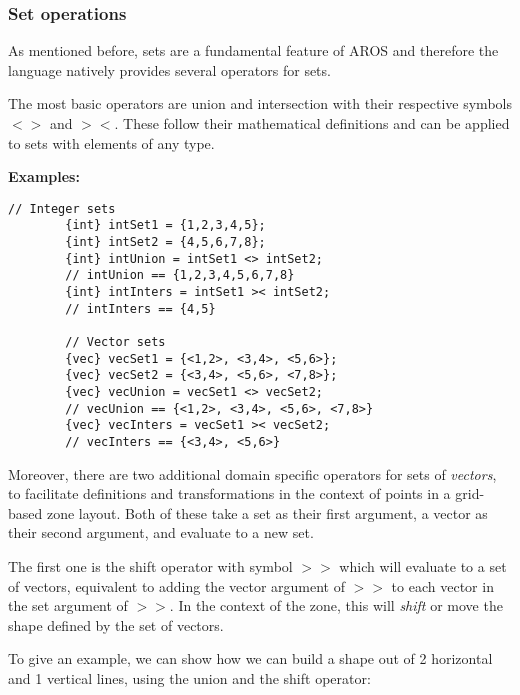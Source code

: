     
\subsubsection{Set operations}
    As mentioned before, sets are a fundamental feature of AROS and therefore the language natively provides several operators for sets.
    \par The most basic operators are union and intersection with their respective symbols $<>$ and $><$. These follow their mathematical definitions and can be applied to sets with elements of any type.
    \par \textbf{Examples:}
    \begin{lstlisting}[language=aros,caption=Union and intersection examples]
        // Integer sets
        {int} intSet1 = {1,2,3,4,5};
        {int} intSet2 = {4,5,6,7,8};
        {int} intUnion = intSet1 <> intSet2;
        // intUnion == {1,2,3,4,5,6,7,8}
        {int} intInters = intSet1 >< intSet2;
        // intInters == {4,5}
        
        // Vector sets
        {vec} vecSet1 = {<1,2>, <3,4>, <5,6>};
        {vec} vecSet2 = {<3,4>, <5,6>, <7,8>};
        {vec} vecUnion = vecSet1 <> vecSet2;
        // vecUnion == {<1,2>, <3,4>, <5,6>, <7,8>}
        {vec} vecInters = vecSet1 >< vecSet2;
        // vecInters == {<3,4>, <5,6>}
    \end{lstlisting}
    \par Moreover, there are two additional domain specific operators for sets of \textit{vectors}, to facilitate definitions and transformations in the context of points in a grid-based zone layout. Both of these take a set as their first argument, a vector as their second argument, and evaluate to a new set.
    \par The first one is the shift operator with symbol $>>$ which will evaluate to a set of vectors, equivalent to adding the vector argument of $>>$ to each vector in the set argument of $>>$. In the context of the zone, this will \textit{shift} or move the shape defined by the set of vectors.
    \par To give an example, we can show how we can build a shape out of 2 horizontal and 1 vertical lines, using the union and the shift operator: 
